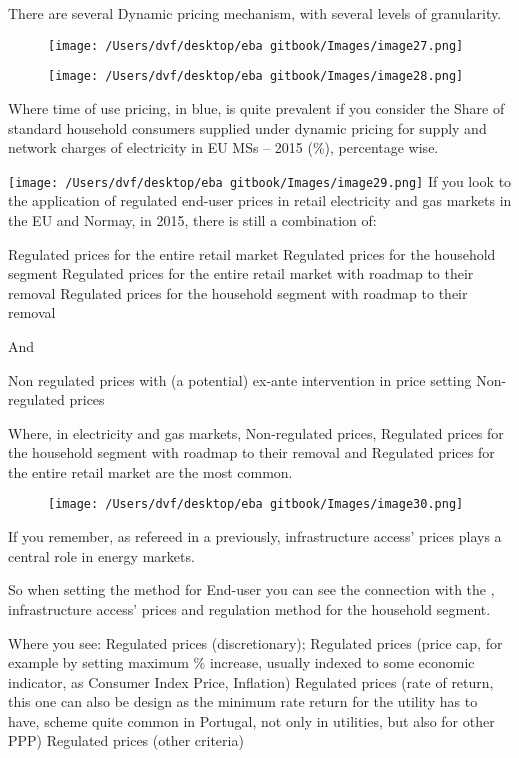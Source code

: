 \documentclass[]{book}
\theoremstyle{definition}
\theoremstyle{definition}
\theoremstyle{definition}
\theoremstyle{remark}
\begin{document}
There are several Dynamic pricing mechanism, with several levels of
granularity.

\begin{figure}[htbp]
\centering
\texttt{[image: /Users/dvf/desktop/eba gitbook/Images/image27.png]}
\caption{}
\end{figure}

\begin{figure}[htbp]
\centering
\texttt{[image: /Users/dvf/desktop/eba gitbook/Images/image28.png]}
\caption{}
\end{figure}

Where time of use pricing, in blue, is quite prevalent if you consider
the Share of standard household consumers supplied under dynamic pricing
for supply and network charges of electricity in EU MSs -- 2015 (\%),
percentage wise.

\texttt{[image: /Users/dvf/desktop/eba gitbook/Images/image29.png]}
If you look to the application of regulated end-user prices in retail
electricity and gas markets in the EU and Normay, in 2015, there is
still a combination of:

Regulated prices for the entire retail market Regulated prices for the
household segment Regulated prices for the entire retail market with
roadmap to their removal Regulated prices for the household segment with
roadmap to their removal

And

Non regulated prices with (a potential) ex-ante intervention in price
setting Non-regulated prices

Where, in electricity and gas markets, Non-regulated prices, Regulated
prices for the household segment with roadmap to their removal and
Regulated prices for the entire retail market are the most common.

\begin{figure}[htbp]
\centering
\texttt{[image: /Users/dvf/desktop/eba gitbook/Images/image30.png]}
\caption{}
\end{figure}

If you remember, as refereed in a previously, infrastructure access'
prices plays a central role in energy markets.

So when setting the method for End-user you can see the connection with
the , infrastructure access' prices and regulation method for the
household segment.

Where you see: Regulated prices (discretionary); Regulated prices (price
cap, for example by setting maximum \% increase, usually indexed to some
economic indicator, as Consumer Index Price, Inflation) Regulated prices
(rate of return, this one can also be design as the minimum rate return
for the utility has to have, scheme quite common in Portugal, not only
in utilities, but also for other PPP) Regulated prices (other criteria)
\end{document}
